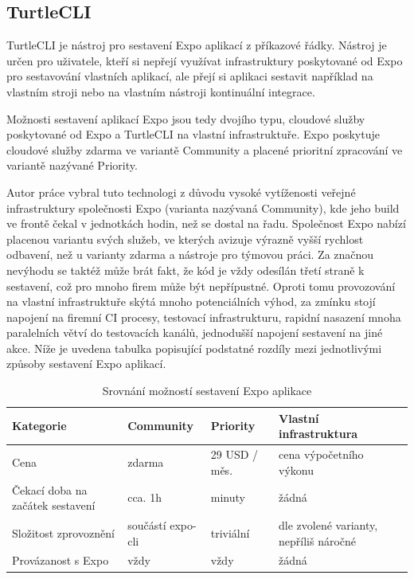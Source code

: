 \subsection{TurtleCLI}

TurtleCLI je nástroj pro sestavení Expo aplikací z příkazové řádky. Nástroj je určen pro uživatele, kteří si nepřejí využívat infrastruktury poskytované od Expo pro sestavování vlastních aplikací, ale přejí si aplikaci sestavit například na vlastním stroji nebo na vlastním nástroji kontinuální integrace.

Možnosti sestavení aplikací Expo jsou tedy dvojího typu, cloudové služby poskytované od Expo a TurtleCLI na vlastní infrastruktuře. Expo poskytuje cloudové služby zdarma ve variantě Community a placené prioritní zpracování ve variantě nazývané Priority.

Autor práce vybral tuto technologi z důvodu vysoké vytíženosti veřejné infrastruktury společnosti Expo (varianta nazývaná Community), kde jeho build ve frontě čekal v jednotkách hodin, než se dostal na řadu. Společnost Expo nabízí placenou variantu svých služeb, ve kterých avizuje výrazně vyšší rychlost odbavení, než u varianty zdarma a nástroje pro týmovou práci. Za značnou nevýhodu se taktéž může brát fakt, že kód je vždy odesílán třetí straně k sestavení, což pro mnoho firem může být nepřípustné. Oproti tomu provozování na vlastní infrastruktuře skýtá mnoho potenciálních výhod, za zmínku stojí napojení na firemní CI procesy, testovací infrastrukturu, rapidní nasazení mnoha paralelních větví do testovacích kanálů, jednodušší napojení sestavení na jiné akce. Níže je uvedena tabulka popisující podstatné rozdíly mezi jednotlivými způsoby sestavení Expo aplikací. 

\begin{table}[H]
	\begin{tabularx}{\textwidth}{|X|X|X|X|}
		\hline
		Kategorie                        & Community         & Priority      & Vlastní infrastruktura                 \\
		\hline
		Cena                             & zdarma            & 29 USD / měs. & cena výpočetního výkonu                \\
		\hline
		Čekací doba na začátek sestavení & cca. 1h           & minuty        & žádná                                  \\
		\hline
		Složitost zprovoznění            & součástí expo-cli & triviální     & dle zvolené varianty, nepříliš náročné \\
		\hline
		Provázanost s Expo               & vždy              & vždy          & žádná \\     
		\hline             
	\end{tabularx}
	\caption{Srovnání možností sestavení Expo aplikace}
\end{table}